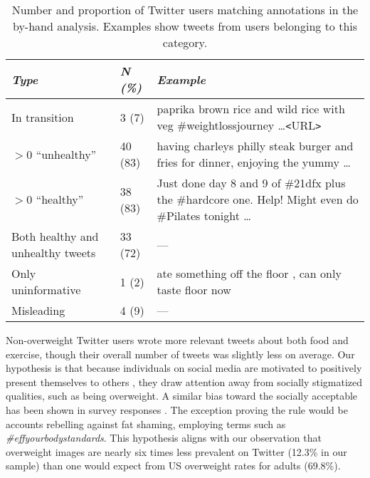 \begin{table}
\centering\small\renewcommand{\arraystretch}{1.5}
\begin{tabular}{p{2.25cm} l p{3.5cm}}
\toprule
\textit{Type}	& \textit{N (\%)}	& \textit{Example}	\\
\midrule
In transition	& 3 (7)	& paprika brown rice and wild rice with veg \#weightlossjourney \ldots \texttt{<}URL\texttt{>} \\ %
$>0$ ``unhealthy''	& 40 (83)	& having charleys philly steak burger and fries for dinner, enjoying the yummy \ldots \\ %
$>0$ ``healthy'' & 38 (83)	& Just done day 8 and 9 of \#21dfx plus the \#hardcore one. Help! Might even do \#Pilates tonight \ldots \\ %
Both healthy and unhealthy tweets	& 33 (72)	& --- \\
Only uninformative	& 1 (2)	& ate something off the floor , can only taste floor now	\\
Misleading	& 4 (9)	& --- \\
\bottomrule
\end{tabular}
\caption{{\small Number and proportion of Twitter users matching annotations in the by-hand analysis. Examples show tweets from users belonging to this category.}} %
\label{tab:byhandanalysis}
\renewcommand{\arraystretch}{1}
\end{table}

Non-overweight Twitter users wrote more relevant tweets about both food and exercise, though their overall number of tweets was slightly less on average. Our hypothesis is that because individuals on social media are motivated to positively present themselves to others \cite{walther2007selective}, they %
draw attention away from socially stigmatized qualities, such as being overweight. A similar bias toward the socially acceptable has been shown in survey responses \cite{phillips1972some}. The exception proving the rule would be accounts rebelling against fat shaming, employing terms such as \textit{\#effyourbodystandards}. This hypothesis %
aligns with our observation that overweight images are nearly six times less prevalent on Twitter (12.3\% in our sample) than one would expect from US overweight rates for adults (69.8\%).

